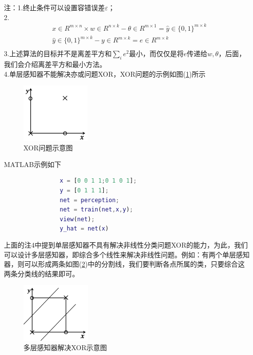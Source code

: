                 \textcolor[rgb]{1 0 0}{注：1.终止条件可以设置容错误差$\varepsilon$；\\
                2.
                \begin{align*}
                &x\in R^{m\times n}\times w\in R^{n\times k} - \theta\in R^{m\times 1} = \hat{y}\in \{0,1\}^{m\times k}\\
                &\hat{y}\in \{0,1\}^{m\times k} - y\in R^{m\times k} = e\in R^{m\times k}\\
                \end{align*}
                3.上述算法的目标并不是离差平方和$\sum_ie^2$最小，而仅仅是将$e$传递给$w,\theta$，后面，我们会介绍离差平方和最小方法。\\
                4.单层感知器不能解决亦或问题XOR，XOR问题的示例如图(\ref{fig:XOR问题示意图})所示
            \begin{figure}[H]
            \centering
            \includegraphics[height=3cm]{images/XOR_problem.jpg}
            \caption{XOR问题示意图}
            \label{fig:XOR问题示意图}
            \end{figure}
                \par
                MATLAB示例如下
                \begin{lstlisting}[language = Matlab]
                %% 单层感知器 perception
                x = [0 0 1 1;0 1 0 1];
                y = [0 1 1 1];
                net = perception;
                net = train(net,x,y);
                view(net);
                y_hat = net(x)
                \end{lstlisting}
                \par
                上面的注4中提到单层感知器不具有解决非线性分类问题XOR的能力，为此，我们可以设计多层感知器，即综合多个线性来解决非线性问题。例如：有两个单层感知器，则可以形成两条如图(\ref{fig:多层感知器解决XOR示意图})中的分割线，我们要判断各点所属的类，只要综合这两条分类线的结果即可。
            \begin{figure}[H]
            \centering
            \includegraphics[height=3cm]{images/multilayer_sensor_to_solve_XOR_problem.jpg}
            \caption{多层感知器解决XOR示意图}
            \label{fig:多层感知器解决XOR示意图}
            \end{figure}

}
